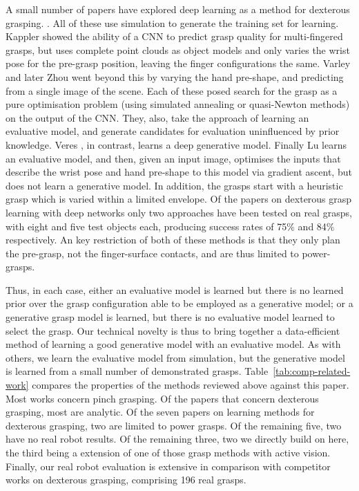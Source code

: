 A small number of papers have explored deep learning as a method for dexterous grasping. \cite{lu2017planning,varley2015generating,veres2017modeling,zhou20176dof,kappler2015leveraging}. All of these use simulation to generate the training set for learning. Kappler \cite{kappler2015leveraging} showed the ability of a CNN to predict grasp quality for multi-fingered grasps, but uses complete point clouds as object models and only varies the wrist pose for the pre-grasp position, leaving the finger configurations the same. Varley \cite{varley2015generating} and later Zhou \cite{zhou20176dof} went beyond this by varying the hand pre-shape, and predicting from a single image of the scene. Each of these posed search for the grasp as a pure optimisation problem (using simulated annealing or quasi-Newton methods) on the output of the CNN. They, also, take the approach of learning an evaluative model, and generate candidates for evaluation uninfluenced by prior knowledge. Veres \cite{veres2017modeling}, in contrast, learns a deep generative model. Finally Lu \cite{lu2017planning} learns an evaluative model, and then, given an input image, optimises the inputs that describe the wrist pose and hand pre-shape to this model via gradient ascent, but does not learn a generative model. In addition, the grasps start with a heuristic grasp which is varied within a limited envelope. Of the papers on dexterous grasp learning with deep networks only two approaches \cite{varley2015generating,lu2017planning} have been tested on real grasps, with eight and five test objects each, producing success rates of 75\% and 84\% respectively. An key restriction of both of these methods is that they only plan the pre-grasp, not the finger-surface contacts, and are thus limited to power-grasps.

Thus, in each case, either an evaluative model is learned but there is no learned prior over the grasp configuration able to be employed as a generative model; or a generative grasp model is learned, but there is no evaluative model learned to select the grasp. Our technical novelty is thus to bring together a data-efficient method of learning a good generative model with an evaluative model. As with others, we learn the evaluative model from simulation, but the generative model is learned from a small number of demonstrated grasps. Table~\ref{tab:comp-related-work} compares the properties of the methods reviewed above against this paper. Most works concern pinch grasping. Of the papers that concern dexterous grasping, most are analytic. Of the seven papers on learning methods for dexterous grasping, two \cite{varley2015generating,lu2017planning} are limited to power grasps. Of the remaining five, two have no real robot results. Of the remaining three, two we directly build on here, the third being a extension of one of those grasp methods with active vision. Finally, our real robot evaluation is extensive in comparison with competitor works on dexterous grasping, comprising 196 real grasps.

